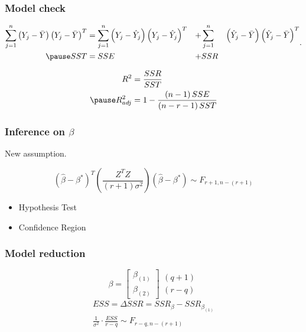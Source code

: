 \documentclass[aspectratio=169,10pt,t]{beamer}
\begin{document}
\begin{frame}[t]
	\frametitle{Model check}
	
	\[
		\begin{aligned}
			\sum^{n}_{j=1} 
			\left( Y_j -\bar{Y}   \right)
			\left( Y_j -\bar{Y}    \right) ^{T}
			&=
			\sum^{n}_{j=1} 
			\left( Y_j -\hat{Y}_{j}  \right)
			\left( Y_j -\hat{Y}_{j}  \right)^{T}
			&+
			&\sum^{n}_{j=1}& 
			\left( \hat{Y}_{j} - \bar{Y}  \right) 
			\left( \hat{Y}_{j} - \bar{Y}  \right) ^{T} \\
			\pause
			SST &= SSE &+ &SSR
		\end{aligned}
	.\] 

	\[
	 \begin{aligned}
		 R^{2} &= \frac{SSR}{SST} \\
		 \pause
		 R^{2}_{adj} & = 1 - \frac{ \left( n-1 \right) SSE}{ \left( n-r-1 \right) SST} 
	 \end{aligned}
	\] 
\end{frame}

\begin{frame}[t]
	\frametitle{Inference on $\beta$}

	New assumption.


	\[
		\left( \hat{\beta} - \beta^{*}\right) ^{T}
		\left( \frac{Z^{T}Z}{ \left( r+1 \right) \sigma^{2}}   \right) 
		\left( \hat{\beta}  -\beta^{*}\right) 
		\sim
		F_{r+1,n- \left( r+1 \right) }
	\] 

	\pause
	\begin{itemize}
		\item Hypothesis Test
		\item Confidence Region
	\end{itemize}

	
\end{frame}




\begin{frame}[t]
	\frametitle{Model reduction}

	\[
	\beta
	=
	\begin{bmatrix}
		\beta_{ \left( 1 \right) }\\
		\beta_{ \left( 2 \right) }
	\end{bmatrix}
	\begin{matrix}
		\left( q+1 \right) \\
		\left( r-q \right) 
	\end{matrix}
	\] 
	\pause
	\[
		\begin{gathered}
		ESS = \Delta SSR =
		SSR_{\beta} 
		-
		SSR_{\beta_{ \left( 1 \right) }} \\
		\frac{1}{ \sigma^{2}} 
		\cdot
		\frac{ESS}{r-q} 
		\sim
		F_{r-q,n- \left( r+1 \right) }
		\end{gathered}
	\]

\end{frame}
\end{document}

